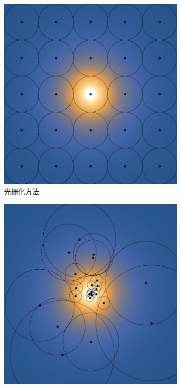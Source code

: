 \cite{a:FastFilteringofReflectionProbes}








\begin{figure}
\begin{fullwidth}
	\begin{subfigure}[b]{0.325\thewidth}
		\includegraphics[width=\textwidth]{figures/pl/sampling-raster}
		\caption{光栅化方法}
	\end{subfigure}
	\begin{subfigure}[b]{0.325\thewidth}
		\includegraphics[width=\textwidth]{figures/pl/sampling-importance}

\end{subfigure}
\end{fullwidth}
\end{figure}
